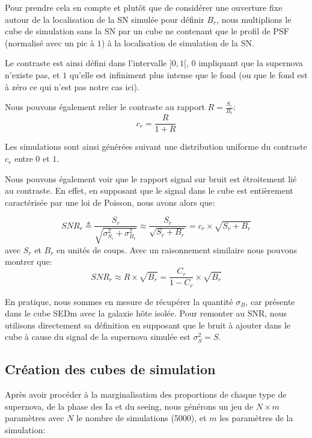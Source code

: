 \documentclass[../main/main.tex]{subfiles}
\begin{document}
Pour prendre cela en compte et plutôt que de considérer une ouverture fixe
autour de la localisation de la SN simulée pour définir $B_{r}$, nous
multiplions le cube de simulation sans la SN par un cube ne contenant
que le profil de PSF (normalisé avec un pic à $1$) à la localisation de
simulation de la SN.

Le contraste est ainsi défini dans l'intervalle $]0,1[$, $0$ impliquant
que la supernova n'existe pas, et $1$ qu'elle est infiniment plus
intense que le fond (ou que le fond est à zéro ce qui n'est pas notre
cas ici).

Nous pouvons également relier le contraste au rapport $R=\frac{S_{r}}{B_{r}}$:
\begin{equation}
  \label{eq:rapportSB}
  c_{r} = \frac{R}{1+R}
\end{equation}

Les simulations sont ainsi générées suivant une distribution uniforme du
contraste $c_{r}$ entre $0$ et $1$.

Nous pouvons également voir que le rapport signal sur bruit est
étroitement lié au contraste. En effet, en supposant que le signal dans
le cube est
entièrement caractérisée par une loi de Poisson, nous avons alors que:

\begin{equation}
  \label{eq:SNR}
  SNR_{r} \triangleq \frac{S_{r}}{\sqrt{\sigma_{S_{r}}^{2}+\sigma_{B_{r}}^{2}}}\approx
  \frac{S_{r}}{\sqrt{S_{r}+B_{r}}} = c_{r}\times\sqrt{S_{r}+B_{r}}
\end{equation}
avec $S_{r}$ et $B_{r}$ en unités de coups. Avec un raisonnement similaire nous
pouvons montrer que:
\begin{equation}
  \label{eq:logsnr}
  SNR_{r}\approx R\times\sqrt{B_{r}} = \frac{C_{r}}{1-C_{r}}\times\sqrt{B_{r}}
\end{equation} 

En pratique, nous sommes en mesure de récupérer la quantité
$\sigma_{B}$, car présente dans le cube SEDm avec la galaxie hôte
isolée. Pour remonter au SNR, nous utilisons directement sa définition
en supposant que le bruit à ajouter dans le cube à cause du signal de la
supernova simulée est $\sigma_{S}^{2}=S$.

\subsection{Création des cubes de simulation}

Après avoir procéder à la marginalisation des proportions de chaque type
de supernova, de la phase des Ia et du seeing, nous générons un jeu de
$N\times m$ paramètres avec $N$ le nombre de simulations (5000), et $m$
les paramètres de la simulation:\\
\end{document}
